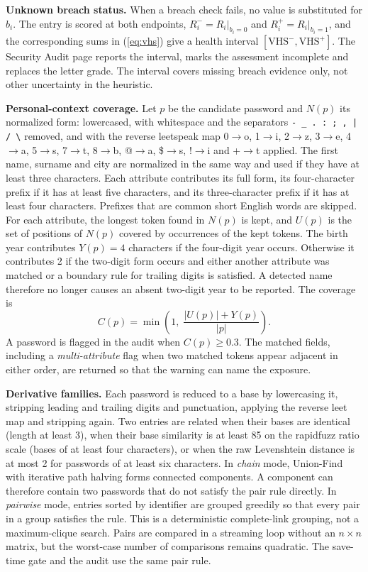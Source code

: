\documentclass[conference]{IEEEtran}
\begin{document}
\textbf{Unknown breach status.} When a breach check fails, no value is substituted for $b_i$. The entry is scored at both endpoints, $R_i^{-}=R_i|_{b_i=0}$ and $R_i^{+}=R_i|_{b_i=1}$, and the corresponding sums in (\ref{eq:vhs}) give a health interval $[\mathrm{VHS}^{-},\mathrm{VHS}^{+}]$. The Security Audit page reports the interval, marks the assessment incomplete and replaces the letter grade. The interval covers missing breach evidence only, not other uncertainty in the heuristic.

\textbf{Personal-context coverage.} Let $p$ be the candidate password and $N(p)$ its normalized form: lowercased, with whitespace and the separators \texttt{- \_ . : ; , | / \textbackslash} removed, and with the reverse leetspeak map 0$\to$o, 1$\to$i, 2$\to$z, 3$\to$e, 4$\to$a, 5$\to$s, 7$\to$t, 8$\to$b, @$\to$a, \$$\to$s, !$\to$i and +$\to$t applied. The first name, surname and city are normalized in the same way and used if they have at least three characters. Each attribute contributes its full form, its four-character prefix if it has at least five characters, and its three-character prefix if it has at least four characters. Prefixes that are common short English words are skipped. For each attribute, the longest token found in $N(p)$ is kept, and $U(p)$ is the set of positions of $N(p)$ covered by occurrences of the kept tokens. The birth year contributes $Y(p)=4$ characters if the four-digit year occurs. Otherwise it contributes 2 if the two-digit form occurs and either another attribute was matched or a boundary rule for trailing digits is satisfied. A detected name therefore no longer causes an absent two-digit year to be reported. The coverage is
\begin{equation}
C(p)=\min\!\left(1,\;\frac{|U(p)|+Y(p)}{|p|}\right).
\label{eq:cov}
\end{equation}
A password is flagged in the audit when $C(p)\geq 0.3$. The matched fields, including a \emph{multi-attribute} flag when two matched tokens appear adjacent in either order, are returned so that the warning can name the exposure.

\textbf{Derivative families.} Each password is reduced to a base by lowercasing it, stripping leading and trailing digits and punctuation, applying the reverse leet map and stripping again. Two entries are related when their bases are identical (length at least 3), when their base similarity is at least 85 on the rapidfuzz ratio scale (bases of at least four characters), or when the raw Levenshtein distance is at most 2 for passwords of at least six characters. In \emph{chain} mode, Union-Find with iterative path halving forms connected components. A component can therefore contain two passwords that do not satisfy the pair rule directly. In \emph{pairwise} mode, entries sorted by identifier are grouped greedily so that every pair in a group satisfies the rule. This is a deterministic complete-link grouping, not a maximum-clique search. Pairs are compared in a streaming loop without an $n\times n$ matrix, but the worst-case number of comparisons remains quadratic. The save-time gate and the audit use the same pair rule.
\end{document}

